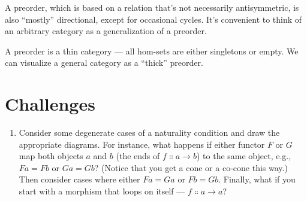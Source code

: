 A preorder, which is based on a relation that's not necessarily
antisymmetric, is also ``mostly'' directional, except for occasional
cycles. It's convenient to think of an arbitrary category as a
generalization of a preorder.

A preorder is a thin category --- all hom-sets are either singletons or
empty. We can visualize a general category as a ``thick'' preorder.

\section{Challenges}

\begin{enumerate}
  \tightlist
  \item
        Consider some degenerate cases of a naturality condition and draw the
        appropriate diagrams. For instance, what happens if either functor
        $F$ or $G$ map both objects $a$ and $b$
        (the ends of $f \Colon a \to b$) to the same
        object, e.g., $F a = F b$ or $G a = G b$?
        (Notice that you get a cone or a co-cone this way.) Then consider
        cases where either $F a = G a$ or $F b = G b$.
        Finally, what if you start with a morphism that loops on itself ---
        $f \Colon a \to a$?
\end{enumerate}